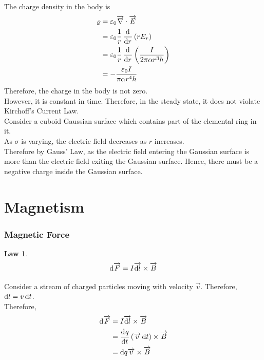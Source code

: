 \documentclass[fleqn, a4paper, 12pt, twoside]{article}
\theoremstyle{definition}
\theoremstyle{theorem}
\newtheorem{law}{Law}
\begin{document}
\begin{solution}
\begin{enumerate}[leftmargin = *]
			~\\
			The charge density in the body is
			\begin{align*}
				\varrho &= \varepsilon_0 \overrightarrow{\nabla} \cdot \overrightarrow{E}\\
				&= \varepsilon_0 \frac{1}{r} \dod{}{r} (r E_r)\\
				&= \varepsilon_0 \frac{1}{r} \dod{}{r} \left( \frac{I}{2 \pi \alpha r^3 h} \right)\\
				&= -\frac{\varepsilon_0 I}{\pi \alpha r^4 h}
			\end{align*}
			Therefore, the charge in the body is not zero.\\
			However, it is constant in time.
			Therefore, in the steady state, it does not violate Kirchoff's Current Law.\\
			Consider a cuboid Gaussian surface which contains part of the elemental ring in it.\\
			As $\sigma$ is varying, the electric field decreases as $r$ increases.\\
			Therefore by Gauss' Law, as the electric field entering the Gaussian surface is more than the electric field exiting the Gaussian surface.
			Hence, there must be a negative charge inside the Gaussian surface.
	\end{enumerate}
\end{solution}

\newpage
\part{Magnetism}

\section{Magnetic Force}

\begin{law}
	\begin{equation*}
		\dif \overrightarrow{F} = I \overrightarrow{\dif l} \times \overrightarrow{B}
	\end{equation*}
\end{law}
Consider a stream of charged particles moving with velocity $\overrightarrow{v}$.
Therefore, $\dif l = v \dif t$.\\
Therefore,
\begin{align*}
	\dif \overrightarrow{F} & = I \overrightarrow{\dif l} \times \overrightarrow{B}               \\
                                & = \dod{q}{t} ( \overrightarrow{v} \dif t) \times \overrightarrow{B} \\
                                & = \dif q \overrightarrow{v} \times \overrightarrow{B}
\end{align*}
\end{document}
